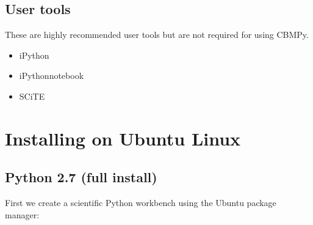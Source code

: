 \documentclass[letterpaper,10pt,english]{sphinxmanual}
\begin{document}
\subsection{User tools}
\label{\detokenize{install_doc:user-tools}}
\sphinxAtStartPar
These are highly recommended user tools but are not required for using CBMPy.
\begin{itemize}
\item {} 
\sphinxAtStartPar
iPython

\item {} 
\sphinxAtStartPar
iPython\sphinxhyphen{}notebook

\item {} 
\sphinxAtStartPar
SCiTE

\end{itemize}


\section{Installing on Ubuntu Linux}
\label{\detokenize{install_doc:installing-on-ubuntu-linux}}

\subsection{Python 2.7 (full install)}
\label{\detokenize{install_doc:python-2-7-full-install}}
\sphinxAtStartPar
First we create a scientific Python workbench using the Ubuntu package manager:

\begin{sphinxVerbatim}[commandchars=\\\{\}]
        
       
     
    
\end{sphinxVerbatim}
\end{document}
